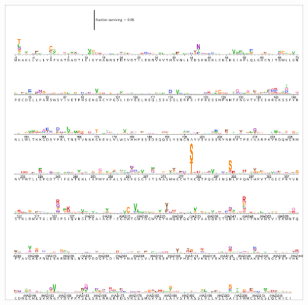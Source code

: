 \documentclass[11pt]{article}
\begin{document}
\begin{suppfigure}
\centerline{\includegraphics[trim=0.1cm 0.02cm 0.1cm 0.03cm,clip=true,width=\textwidth]{figs/logoplots/FI6v3_fracsurvive.pdf}}
\caption{\label{suppfig:FI6v3logo}
{\bf The excess fraction surviving selection with antibody FI6v3 for all amino-acid mutations.}
The excess fraction surviving for each replicate was computed using Equation~\ref{eq:fracsurvive_excess}, then we took the median across all technical and biological replicates for each antibody concentration, and then took the medians of those values across concentrations.
The height of each letter is proportional to the excess fraction surviving of virions with that mutation.
The scale bar at the top of the plot relates the letter heights to the actual fractions.
The sites are labeled using H3 numbering.
}
\end{suppfigure}
\end{document}

